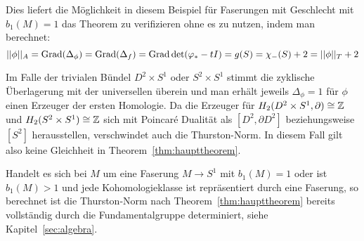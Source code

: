 \begin{bsp}
        Dies liefert die Möglichkeit in diesem Beispiel für Faserungen mit Geschlecht mit $b_1(M)=1$ das Theorem zu verifizieren ohne es zu nutzen, indem man berechnet: 
        \[
            ||\phi||_A=\operatorname{Grad}(\Delta_\phi)=\operatorname{Grad} (\Delta_f) = \operatorname{Grad} \det (\varphi_*-tI) = g(S) = \chi_-(S) +2 = ||\phi||_T+2
        \]

        Im Falle der trivialen Bündel $D^2\times S^1$ oder $S^2\times S^1$ stimmt die zyklische Überlagerung mit der universellen überein und man erhält jeweils $\Delta_\phi =1$ für $\phi$ einen Erzeuger der ersten Homologie. Da die Erzeuger für $H_2(D^2 \times S^1, \partial)\cong \mathbb{Z}$ und $H_2(S^2\times S^1) \cong \mathbb{Z}$ sich mit Poincaré Dualität als $[D^2,\partial D^2]$ beziehungsweise $[S^2]$ herausstellen, verschwindet auch die Thurston-Norm. In diesem Fall gilt also keine Gleichheit in Theorem~\ref{thm:haupttheorem}. 

    \end{bsp}

    \begin{bsp}
        Handelt es sich bei $M$ um eine Faserung $M\to S^1$ mit $b_1(M)=1$ oder ist $b_1(M)>1$ und jede Kohomologieklasse ist repräsentiert durch eine Faserung, so berechnet ist die Thurston-Norm nach Theorem~\ref{thm:haupttheorem} bereits vollständig durch die Fundamentalgruppe determiniert, siehe Kapitel~\ref{sec:algebra}.
    \end{bsp}


